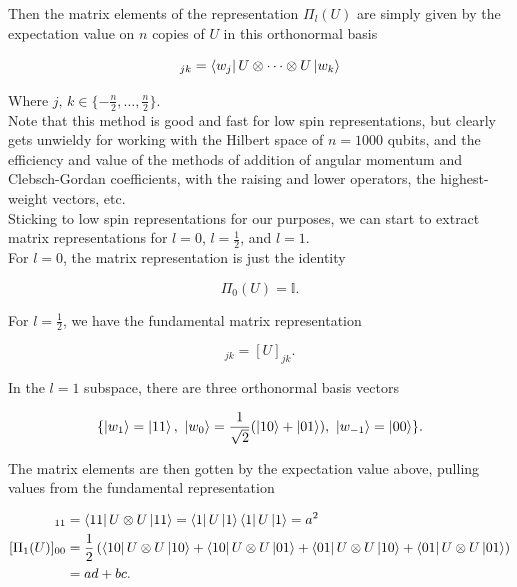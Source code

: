 \noindent Then the matrix elements of the representation $\Pi_l (U)$ are simply given by the expectation value on $n$ copies of $U$ in this orthonormal basis

\begin{equation}
[\Pi_l (U) ]_{jk} = \bra{w_j} U \otimes \dots \otimes U \ket{w_k}
\end{equation}

\noindent Where $j, \, k \in \{ -\frac{n}{2}, \dots, \frac{n}{2} \}$. \\

\noindent Note that this method is good and fast for low spin representations, but clearly gets unwieldy for working with the Hilbert space of $n=1000$ qubits, and the efficiency and value of the methods of addition of angular momentum and Clebsch-Gordan coefficients, with the raising and lower operators, the highest-weight vectors, etc. \\

\noindent Sticking to low spin representations for our purposes, we can start to extract matrix representations for $l=0$, $l=\frac{1}{2}$, and $l=1$. \\

\noindent For $l=0$, the matrix representation is just the identity

\begin{equation}
\Pi_0 (U) = \mathbb{I}.
\end{equation}

\noindent For $l=\frac{1}{2}$, we have the fundamental matrix representation 

\begin{equation}
[\Pi_{\frac{1}{2}} (U) ]_{jk} = [U]_{jk}.
\end{equation}

\noindent In the $l=1$ subspace, there are three orthonormal basis vectors

\begin{equation}
\{ \ket{w_1} = \ket{1 1}, \,\, \ket{w_0} = \frac{1}{\sqrt{2}} (\ket{1 0} + \ket{0 1}), \,\, \ket{w_{-1}} = \ket{0 0} \}.
\end{equation}

\noindent The matrix elements are then gotten by the expectation value above, pulling values from the fundamental representation

\begin{align}
[\Pi_1 (U) ]_{11} &= \bra{1 1} U \otimes U \ket{1 1} = \bra{1} U \ket{1} \bra{1} U \ket{1} = a^2 \\
[\Pi_1 (U) ]_{00} &= \frac{1}{2} \left( \bra{1 0} U \otimes U \ket{1 0} + \bra{1 0} U \otimes U \ket{0 1} + \bra{0 1} U \otimes U \ket{1 0} + \bra{0 1} U \otimes U \ket{0 1} \right) \\
 &= ad + bc.
\end{align}

